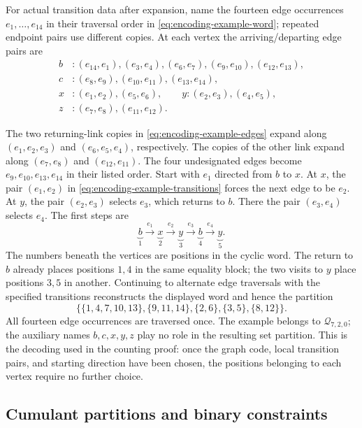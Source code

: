 \documentclass[11pt]{article}
\theoremstyle{definition}
\theoremstyle{remark}
\theoremstyle{plain}
\begin{document}
\begin{samepage}
For actual transition data after expansion, name the fourteen
edge occurrences $e_1,\ldots,e_{14}$ in their traversal order in
\eqref{eq:encoding-example-word}; repeated endpoint pairs use
different copies. At each vertex the arriving/departing edge
pairs are
\begin{equation}\label{eq:encoding-example-transitions}
\begin{aligned}
 b &: (e_{14},e_1),(e_3,e_4),(e_6,e_7),
                    (e_9,e_{10}),(e_{12},e_{13}),\\
 c &: (e_8,e_9),(e_{10},e_{11}),(e_{13},e_{14}),\\
 x &: (e_1,e_2),(e_5,e_6),\qquad
 y : (e_2,e_3),(e_4,e_5),\\
 z &: (e_7,e_8),(e_{11},e_{12}).
\end{aligned}
\end{equation}
\end{samepage}
The two returning-link copies in
\eqref{eq:encoding-example-edges} expand along
$(e_1,e_2,e_3)$ and $(e_6,e_5,e_4)$, respectively.
The copies of the other link expand along $(e_7,e_8)$ and
$(e_{12},e_{11})$. The four undesignated edges become
$e_9,e_{10},e_{13},e_{14}$ in their listed order.
Start with $e_1$ directed from $b$ to $x$.
At $x$, the pair $(e_1,e_2)$ in
\eqref{eq:encoding-example-transitions} forces the next edge to be
$e_2$. At $y$, the pair $(e_2,e_3)$ selects $e_3$, which returns
to $b$. There the pair $(e_3,e_4)$ selects $e_4$. The first steps are
\[
 \underbrace{b}_{1}\xrightarrow{e_1}
 \underbrace{x}_{2}\xrightarrow{e_2}
 \underbrace{y}_{3}\xrightarrow{e_3}
 \underbrace{b}_{4}\xrightarrow{e_4}
 \underbrace{y}_{5}.
\]
The numbers beneath the vertices are positions in the cyclic word.
The return to $b$ already places positions $1,4$ in the same equality
block; the two visits to $y$ place positions $3,5$ in another.
Continuing to alternate edge traversals with the specified transitions
reconstructs the displayed word and hence the partition
\[
 \bigl\{\{1,4,7,10,13\},\{9,11,14\},
          \{2,6\},\{3,5\},\{8,12\}\bigr\}.
\]
All fourteen edge occurrences are traversed once. The example
belongs to $\mathcal Q_{7,2,0}$; the auxiliary names $b,c,x,y,z$
play no role in the resulting set partition.
This is the decoding used in the counting proof: once the graph
code, local transition pairs, and starting direction have been chosen,
the positions belonging to each vertex require no further choice.

\subsection{Cumulant partitions and binary constraints}\label{sec:binary-constraints}
\end{document}
